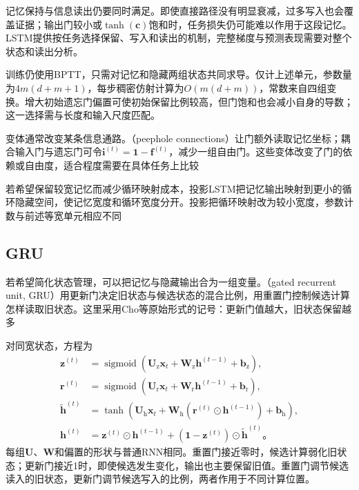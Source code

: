 记忆保持与信息读出仍要同时满足。即使直接路径没有明显衰减，过多写入也会覆盖证据；输出门较小或$\tanh(\bm c)$饱和时，任务损失仍可能难以作用于这段记忆。LSTM提供按任务选择保留、写入和读出的机制，完整梯度与预测表现需要对整个状态和读出分析。

训练仍使用BPTT，只需对记忆和隐藏两组状态共同求导。仅计上述单元，参数量为$4m(d+m+1)$，每步稠密仿射计算为$O(m(d+m))$，常数来自四组变换。增大初始遗忘门偏置可使初始保留比例较高，但门饱和也会减小自身的导数；这一选择需与长度和输入尺度匹配。

变体通常改变某条信息通路。（peephole connections）让门额外读取记忆坐标；耦合输入门与遗忘门可令$\bm{i}^{(t)}=\bm{1}-\bm{f}^{(t)}$，减少一组自由门。这些变体改变了门的依赖或自由度，适合程度需要在具体任务上比较

若希望保留较宽记忆而减少循环映射成本，投影LSTM把记忆输出映射到更小的循环隐藏空间，使记忆宽度和循环宽度分开。投影把循环映射改为较小宽度，参数计数与前述等宽单元相应不同

\subsection{GRU}
\label{sec:rnn-gru}

若希望简化状态管理，可以把记忆与隐藏输出合为一组变量。（gated recurrent unit, GRU）用更新门决定旧状态与候选状态的混合比例，用重置门控制候选计算怎样读取旧状态。这里采用Cho等原始形式的记号：更新门值越大，旧状态保留越多

对同宽状态，方程为
\begin{equation}
  \begin{aligned}
    \bm{z}^{(t)}&=\operatorname{sigmoid}\!\left(
      \bm{U}_{\mathrm{z}}\bm{x}_t+\bm{W}_{\mathrm{z}}\bm{h}^{(t-1)}
      +\bm{b}_{\mathrm{z}}\right),\\
    \bm{r}^{(t)}&=\operatorname{sigmoid}\!\left(
      \bm{U}_{\mathrm{r}}\bm{x}_t+\bm{W}_{\mathrm{r}}\bm{h}^{(t-1)}
      +\bm{b}_{\mathrm{r}}\right),\\
    \widetilde{\bm{h}}^{(t)}&=\tanh\!\left(
      \bm{U}_{\mathrm{h}}\bm{x}_t
      +\bm{W}_{\mathrm{h}}(\bm{r}^{(t)}\odot\bm{h}^{(t-1)})
      +\bm{b}_{\mathrm{h}}\right),\\
    \bm{h}^{(t)}&=\bm{z}^{(t)}\odot\bm{h}^{(t-1)}
      +(\bm{1}-\bm{z}^{(t)})\odot\widetilde{\bm{h}}^{(t)}\text{。}
  \end{aligned}
  \label{eq:rnn-gru-update}
\end{equation}
每组$\bm{U}$、$\bm{W}$和偏置的形状与普通RNN相同。重置门接近零时，候选计算弱化旧状态；更新门接近1时，即使候选发生变化，输出也主要保留旧值。重置门调节候选读入的旧状态，更新门调节候选写入的比例，两者作用于不同计算位置。

